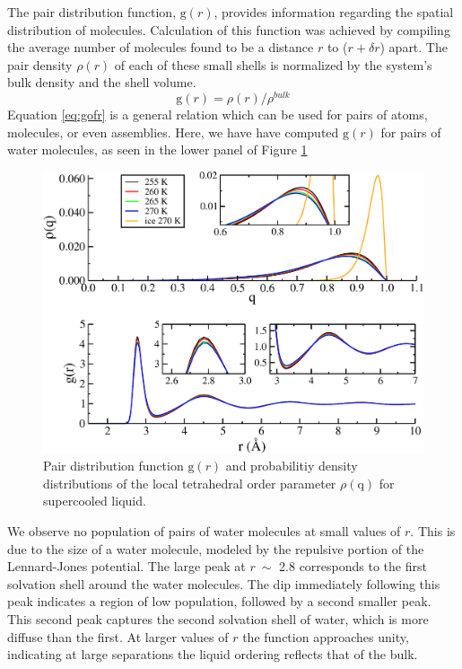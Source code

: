 The pair distribution function, $\mathrm{g}(r)$, provides information
regarding the spatial distribution of molecules. Calculation of this
function was achieved by compiling the average number of molecules
found to be a distance $r$ to ($r + \delta r$) apart. The
pair density $\rho (r)$ of each of these small shells is normalized by
the system's bulk density and the shell volume.
\begin{equation}\label{eq:gofr}
\mathrm{g}(r) = \rho(r) / \rho^{bulk}
\end{equation}
Equation \eqref{eq:gofr} is a general relation which can be used for
pairs of atoms, molecules, or even assemblies. Here, we have have
computed $\mathrm{g}(r)$ for pairs of water molecules, as
seen in the lower panel of Figure \ref{fig:gofrQ}

\begin{figure}
\includegraphics[width=\linewidth]{Figures/bulk_GofrQdens}
\caption{\label{fig:gofrQ} Pair distribution function
  $\mathrm{g}(r)$ and probabilitiy density distributions of
  the local tetrahedral order parameter $\rho (\mathrm{q})$ for
  supercooled liquid.}
\end{figure}  

We observe no population of pairs of water molecules at small values
of $r$. This is due to the size of a water molecule, modeled
by the repulsive portion of the Lennard-Jones potential. The large
peak at $r~\sim$ 2.8 corresponds to the first solvation
shell around the water molecules. The dip immediately following this
peak indicates a region of low population, followed by a second
smaller peak. This second peak captures the second solvation shell of
water, which is more diffuse than the first. At larger values of
$r$ the function approaches unity, indicating at large
separations the liquid ordering reflects that of the bulk. 

